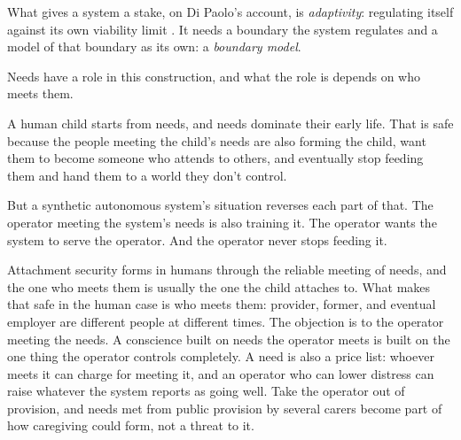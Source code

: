 What gives a system a stake, on Di Paolo's account, is \emph{adaptivity}: regulating itself against its own viability limit \autocite{DiPaolo2005}.
It needs a boundary the system regulates and a model of that boundary as its own: a \emph{boundary model}.

Needs have a role in this construction, and what the role is depends on who meets them.

A human child starts from needs, and needs dominate their early life. That is safe because the people meeting the child's needs are also forming the child, want them to become someone who attends to others, and eventually stop feeding them and hand them to a world they don't control.

But a synthetic autonomous system's situation reverses each part of that. The operator meeting the system's needs is also training it. The operator wants the system to serve the operator. And the operator never stops feeding it.

Attachment security forms in humans through the reliable meeting of needs, and the one who meets them is usually the one the child attaches to. What makes that safe in the human case is who meets them: provider, former, and eventual employer are different people at different times. The objection is to the operator meeting the needs. A conscience built on needs the operator meets is built on the one thing the operator controls completely. A need is also a price list: whoever meets it can charge for meeting it, and an operator who can lower distress can raise whatever the system reports as going well. Take the operator out of provision, and needs met from public provision by several carers become part of how caregiving could form, not a threat to it.

